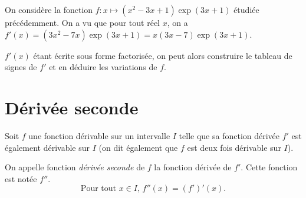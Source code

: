 \documentclass[11pt,fleqn, openany]{book} %
\begin{document}
\begin{example}On considère la fonction $f:x\mapsto (x^2-3x+1)\exp(3x+1)$ étudiée précédemment. On a vu que pour tout réel $x$, on a $f'(x)=(3x^2-7x)\exp(3x+1)=x(3x-7)\exp(3x+1)$.

$f'(x)$ étant écrite sous forme factorisée, on peut alors construire le tableau de signes de $f'$ et en déduire les variations de $f$.

\begin{center}
\end{center}

\end{example}
\vspace{-0.5cm}


\section{Dérivée seconde}

\begin{definition} Soit $f$ une fonction dérivable sur un intervalle $I$ telle que sa fonction dérivée $f'$ est également dérivable sur $I$ (on dit également  que $f$ est deux fois dérivable sur $I$).

On appelle fonction \textit{dérivée seconde} de $f$ la fonction dérivée de $f'$. Cette fonction est notée $f''$.
\[ \text{Pour tout } x \in I, \, f''(x)=(f')'(x).\]\end{definition}
\end{document}
